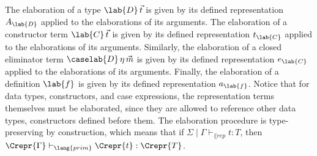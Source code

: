 The elaboration of a type $\lab{D}\,\vec{t}$ is given by its defined
representation $A_{\lab{D}}$ applied to the elaborations of its arguments. The
elaboration of a constructor term $\lab{C}\,\vec{t}$ is given by its defined
representation $t_{\lab{C}}$ applied to the elaborations of its arguments.
Similarly, the elaboration of a closed eliminator term
$\caselab{D}\,\eta\,\vec{m}$ is given by its defined representation
$e_{\lab{C}}$ applied to the elaborations of its arguments. Finally, the
elaboration of a definition $\lab{f}$ is given by its defined representation
$a_{\lab{f}}$. Notice that for data types, constructors, and case expressions,
the representation terms themselves must be elaborated, since they are allowed
to reference other data types, constructors defined before them. The
elaboration procedure is type-preserving by construction, which means that if
$\Sigma \mid \Gamma \vdash_{\lang{rep}} t : T$, then $\Crepr{\Gamma}
  \vdash_{\lang{prim}} \Crepr{t} : \Crepr{T}$. 

